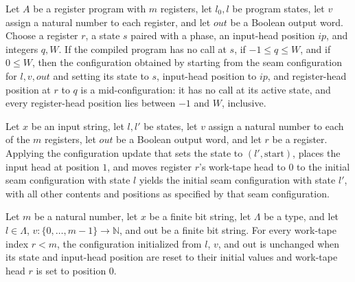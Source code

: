 \begin{lemma}
\label{Complexity.LogProg.mid_xCfg}
\leanok
{}
Let $A$ be a register program with $m$ registers, let $l_0,l$ be program states, let $v$
assign a natural number to each register, and let $out$ be a Boolean output word. Choose
a register $r$, a state $s$ paired with a phase, an input-head position $ip$, and
integers $q,W$. If the compiled program has no call at $s$, if $-1\le q\le W$, and if
$0\le W$, then the configuration obtained by starting from the seam configuration for
$l,v,out$ and setting its state to $s$, input-head position to $ip$, and register-head
position at $r$ to $q$ is a mid-configuration: it has no call at its active state, and
every register-head position lies between $-1$ and $W$, inclusive.
\end{lemma}

\begin{lemma}
\label{Complexity.LogProg.xCfg_aseam}
\leanok
{}
Let $x$ be an input string, let $l,l'$ be states, let $v$ assign a natural number to
each of the $m$ registers, let $out$ be a Boolean output word, and let $r$ be a
register. Applying the configuration update that sets the state to
$(l',\mathrm{start})$, places the input head at position $1$, and moves register $r$'s
work-tape head to $0$ to the initial seam configuration with state $l$ yields the
initial seam configuration with state $l'$, with all other contents and positions as
specified by that seam configuration.
\end{lemma}

\begin{lemma}
\label{Complexity.LogProg.xCfg_aseam_self}
\leanok
{}
Let $m$ be a natural number, let $x$ be a finite bit string, let $\Lambda$ be a type,
and let $l\in\Lambda$, $v:\{0,\ldots,m-1\}\to\mathbb{N}$, and $\mathrm{out}$ be a finite
bit string. For every work-tape index $r<m$, the configuration initialized from $l$,
$v$, and $\mathrm{out}$ is unchanged when its state and input-head position are reset to
their initial values and work-tape head $r$ is set to position $0$.
\end{lemma}

